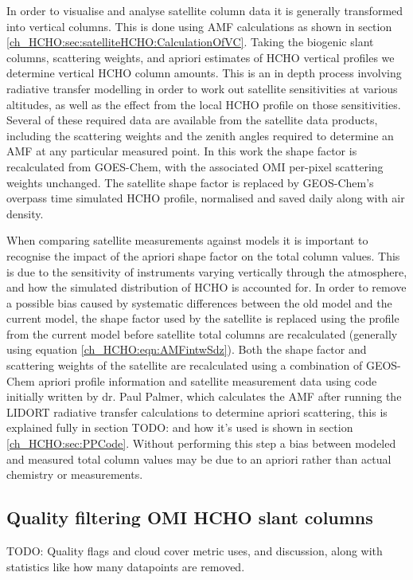     In order to visualise and analyse satellite column data it is generally transformed into vertical columns. 
    This is done using AMF calculations as shown in section \ref{ch_HCHO:sec:satelliteHCHO:CalculationOfVC}.
    Taking the biogenic slant columns, scattering weights, and apriori estimates of HCHO vertical profiles we determine vertical HCHO column amounts.
    This is an in depth process involving radiative transfer modelling in order to work out satellite sensitivities at various altitudes, as well as the effect from the local HCHO profile on those sensitivities.
    Several of these required data are available from the satellite data products, including the scattering weights and the zenith angles required to determine an AMF at any particular measured point.
    In this work the shape factor is recalculated from GOES-Chem, with the associated OMI per-pixel scattering weights unchanged. 
    The satellite shape factor is replaced by GEOS-Chem's overpass time simulated HCHO profile, normalised and saved daily along with air density.
    
    When comparing satellite measurements against models it is important to recognise the impact of the apriori shape factor on the total column values.
    This is due to the sensitivity of instruments varying vertically through the atmosphere, and how the simulated distribution of HCHO is accounted for.
    In order to remove a possible bias caused by systematic differences between the old model and the current model, the shape factor used by the satellite is replaced using the profile from the current model before satellite total columns are recalculated (generally using equation \ref{ch_HCHO:eqn:AMFintwSdz}).
    Both the shape factor and scattering weights of the satellite are recalculated using a combination of GEOS-Chem apriori profile information and satellite measurement data using code initially written by dr. Paul Palmer, which calculates the AMF after running the LIDORT radiative transfer calculations to determine apriori scattering, this is explained fully in section TODO: and how it's used is shown in section \ref{ch_HCHO:sec:PPCode}.
    Without performing this step a bias between modeled and measured total column values may be due to an apriori rather than actual chemistry or measurements.

  \subsection{Quality filtering OMI HCHO slant columns}
    \label{ch_HCHO:sec:OMIFiltering}
    TODO: Quality flags and cloud cover metric uses, and discussion, along with statistics like how many datapoints are removed.
    
